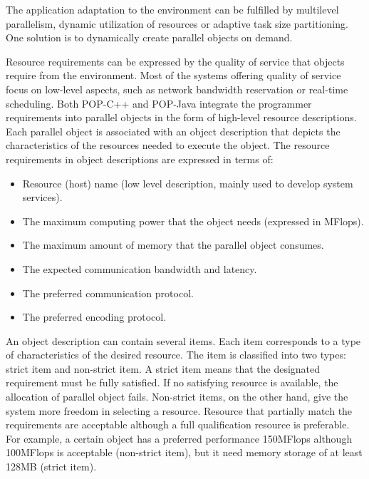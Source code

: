 The application adaptation to the environment can be fulfilled by
multilevel parallelism, dynamic utilization of resources or adaptive
task size partitioning. One solution is to dynamically create parallel
objects on demand.

Resource requirements can be expressed by the quality of service that
objects require from the environment. Most of the systems offering
quality of service focus on low-level aspects, such as network bandwidth
reservation or real-time scheduling. Both POP-C++ and POP-Java integrate the programmer
requirements into parallel objects in the form of high-level resource
descriptions. Each parallel object is associated with an object
description that depicts the characteristics of the resources needed to
execute the object. The resource requirements in object descriptions are
expressed in terms of:

\begin{itemize}

\item Resource (host) name (low level description, mainly used to
develop system services).

\item The maximum computing power that the object needs (expressed in
MFlops).

\item The maximum amount of memory that the parallel object consumes.

\item The expected communication bandwidth and latency.

\item The preferred communication protocol.

\item The preferred encoding protocol.


\end{itemize}

An object description can contain several items. Each item corresponds
to a type of characteristics of the desired resource. The item is
classified into two types: strict item and non-strict item. A strict
item means that the designated requirement must be fully satisfied. If
no satisfying resource is available, the allocation of parallel object
fails. Non-strict items, on the other hand, give the system more freedom
in selecting a resource. Resource that partially match the requirements
are acceptable although a full qualification resource is  preferable.
For example, a certain object has a preferred performance 150MFlops
although 100MFlops is acceptable (non-strict item), but it need memory
storage of at least 128MB (strict item).\s

